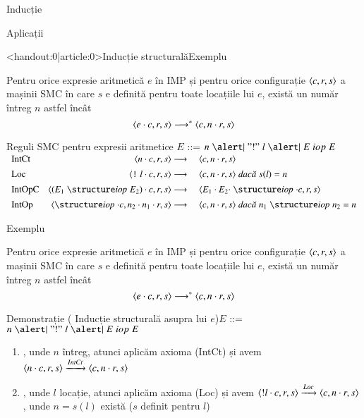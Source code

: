 \documentclass[xcolor=pdftex,romanian,colorlinks]{beamer}
\begin{document}
\begin{section}{Inducție}
\begin{subsection}{Aplicații}
\begin{frame}<handout:0|article:0>{Inducție structurală}{Exemplu}
\begin{theorem}
Pentru orice expresie aritmetică $e$ în IMP și pentru  orice configurație ${\langle{c,r,s}\rangle}$ a mașinii SMC în care $s$ e definită pentru toate locațiile lui $e$, există un număr întreg $n$ astfel încât 
$${\langle{e\cdot c,  r, s}\rangle} \longrightarrow^\ast {\ensuremath \langle{c, n\cdot r, s}\rangle}$$
\end{theorem}
\begin{block}{Reguli SMC pentru expresii aritmetice $E$ ::= $n \Smid {\mathrel{"!"} l} \Smid E \mathrel{iop} E$}
$\begin{array}{l@{\extracolsep{1em}}r@{{}\longrightarrow{}}l}
\mbox{IntCt}&
\c{n\cdot c,r,s} & \c{c, n \cdot r, s}
\\[1ex]
\mbox{Loc}&
\c{\terminal{!} l\cdot c,r,s} & \c{c, n \cdot r, s}  \Sdaca s(l) = n
\\[1ex]
\mbox{IntOpC}&
\c{(E_1 \iop E_2) \cdot c, r, s} & \c{E_1 \cdot E_2 \cdot \iop \cdot c, r, s}
\\[1ex]
\mbox{IntOp}&
\c{\iop \cdot c, n_2\cdot n_1 \cdot r, s} & \c{c, n \cdot r, s} \Sdaca n_1 \iop n_2 = n
\end{array}$
\end{block}
\end{frame}

\begin{frame}{}{Exemplu}
  \setcounter{theorem}{0}
\begin{theorem}
Pentru orice expresie aritmetică $e$ în IMP și pentru  orice configurație ${\langle{c,r,s}\rangle}$ a mașinii SMC în care $s$ e definită pentru toate locațiile lui $e$, există un număr întreg $n$ astfel încât 
$${\langle{e\cdot c,  r, s}\rangle} \longrightarrow^\ast {\ensuremath \langle{c, n\cdot r, s}\rangle}$$
\end{theorem}

\begin{block}{Demonstrație (%
Inducție structurală asupra  lui $e$)\hfill  $E$ ::= $n \Smid {\mathrel{"!"} l} \Smid E \mathrel{iop} E$}
\begin{enumerate}
\item {}, unde $n$ întreg, atunci aplicăm axioma (IntCt) și avem 
${\langle{n\cdot c,  r, s}\rangle} \xrightarrow{IntCt} {\langle{c, n\cdot r, s}\rangle}$
\item {}, unde $l$ locație, atunci aplicăm axioma (Loc) și avem 
${\langle{! l\cdot c,  r, s}\rangle} \xrightarrow{Loc} {\langle{c, n\cdot r, s}\rangle}$, unde $n=s(l)$ există  ($s$ definit pentru $l$)
\end{enumerate}
\end{block}
\end{frame}


\end{subsection}
\end{section}
\end{document}

